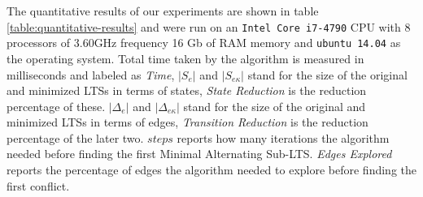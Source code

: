 

  
  
The quantitative results of our experiments are shown in table 
\ref{table:quantitative-results} and were run on an 
\texttt{Intel\textsuperscript{\textregistered} Core\textsuperscript{\texttrademark}
 i7-4790} CPU with 8 processors of 3.60GHz frequency
16 Gb of RAM memory and \texttt{ubuntu 14.04} as the operating system.
Total time taken by the algorithm is measured in milliseconds and
labeled as \emph{Time}, $|S_e|$ and $|S_{e\kappa}|$ stand for
the size of the original and minimized LTSs in terms of states,
\emph{State Reduction} is the reduction percentage of these.  
$|\Delta_e|$ and $|\Delta_{e\kappa}|$ stand for
the size of the original and minimized LTSs in terms of edges,
\emph{Transition Reduction} is the reduction percentage of the later two.  
$steps$ reports how many iterations the algorithm needed before finding
the first Minimal Alternating Sub-LTS. \emph{Edges Explored} reports the percentage of
edges the algorithm needed to explore before finding the first
conflict.
 

